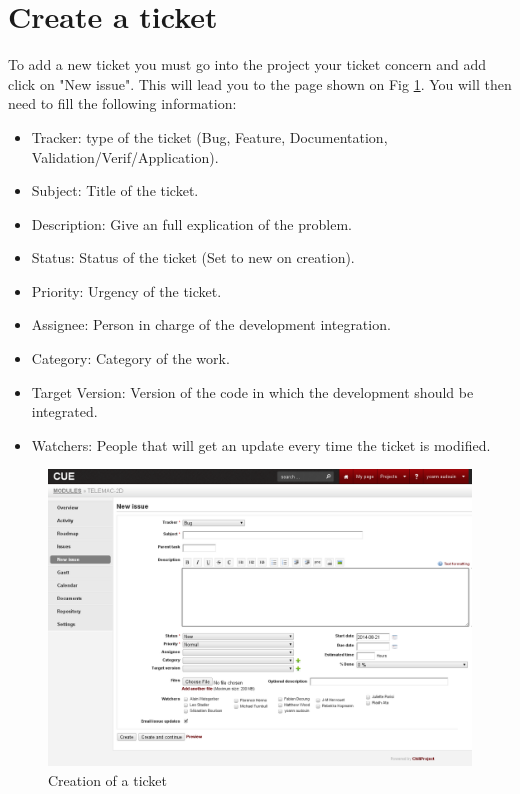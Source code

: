 \section{Create a ticket}
%
%
To add a new ticket you must go into the project your ticket concern and add
click on "New issue". This will lead you to the page shown on Fig
\ref{fig:cue-ticket}.  You will then need to fill the following information:
\begin{itemize}
\item Tracker: type of the ticket (Bug, Feature, Documentation,
Validation/Verif/Application).
\item Subject: Title of the ticket.
\item Description: Give an full explication of the problem.
\item Status: Status of the ticket (Set to new on creation).
\item Priority: Urgency of the ticket.
\item Assignee: Person in charge of the development integration.
\item Category: Category of the work.
\item Target Version: Version of the code in which the development should be
integrated.
\item Watchers: People that will get an update every time the ticket is
modified.
\end{itemize}
\begin{figure}[H]
    \centering
    \includegraphics[scale=0.35]{graphics/cue-ticket.png}
    \caption{Creation of a ticket}
    \label{fig:cue-ticket}
\end{figure}

